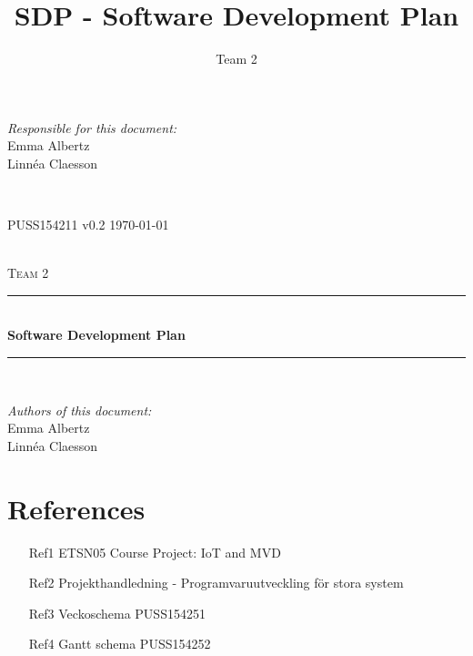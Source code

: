 \documentclass[a4paper]{article}
\title{SDP - Software Development Plan}
\author{Team 2}
\begin{document}
\begin{titlepage}
\newcommand{\HRule}{\rule{\linewidth}{0.5mm}}

\begin{minipage}{0.5\textwidth}
\begin{flushleft} %
\textit{Responsible for this document:}\\
Emma Albertz \\
Linnéa Claesson
\end{flushleft}
\end{minipage}
~
\begin{minipage}{0.4\textwidth}
\begin{flushright}
PUSS154211 v0.2 
\today
\end{flushright}
\end{minipage}\\[3cm]

\centering
\textsc{\LARGE Team 2}\\[0.5cm]

\HRule \\[0.4cm]
{ \huge \bfseries Software Development Plan}\\[0.4cm] %
\HRule \\[1.5cm]

\vfill
\begin{flushleft}
\textit{Authors of this document:}\\
Emma Albertz \\
Linnéa Claesson
\end{flushleft}



\end{titlepage}
\setcounter{tocdepth}{2}
\tableofcontents
\newpage
{}

\section{References}
\begin{itemize}
\item[Ref1] ETSN05 Course Project: IoT and MVD 
\item[Ref2] Projekthandledning - Programvaruutveckling för stora system 
\item[Ref3] Veckoschema PUSS154251
\item[Ref4] Gantt schema PUSS154252
\end{itemize}
\end{document}
